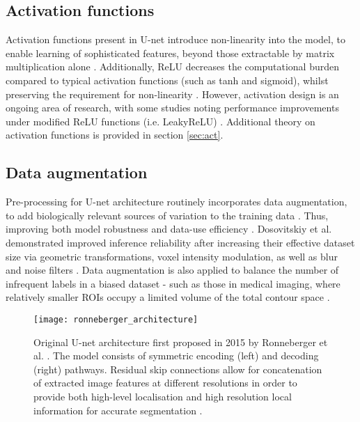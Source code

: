 \subsection{Activation functions}

Activation functions present in U-net introduce non-linearity into the model, to enable learning of sophisticated features, beyond those extractable by matrix multiplication alone \cite{Maier2019}. Additionally, ReLU decreases the computational burden compared to typical activation functions (such as tanh and sigmoid), whilst preserving the requirement for non-linearity \cite{Chigozie2018}. However, activation design is an ongoing area of research, with some studies noting performance improvements under modified ReLU functions (i.e. LeakyReLU) \cite{Lin2018}. Additional theory on activation functions is provided in section \ref{sec:act}.

\subsection{Data augmentation}

Pre-processing for U-net architecture routinely incorporates data augmentation, to add biologically relevant sources of variation to the training data \cite{Maier2019, Hesamian2019, Lundervold2019}. Thus, improving both model robustness and data-use efficiency \cite{Ronneberger_2015}. Dosovitskiy et al. demonstrated improved inference reliability after increasing their effective dataset size via geometric transformations, voxel intensity modulation, as well as blur and noise filters \cite{Dosovitskiy2014}. Data augmentation is also applied to balance the number of infrequent labels in a biased dataset \cite{Maier2019} - such as those in medical imaging, where relatively smaller ROIs occupy a limited volume of the total contour space \cite{Khan2019}. 


\begin{figure}
	\begin{center}
		\texttt{[image: ronneberger\_architecture]}
		\caption{Original U-net architecture first proposed in 2015 by Ronneberger et al. \cite{Ronneberger_2015}. The model consists of symmetric encoding (left) and decoding (right) pathways. Residual skip connections allow for concatenation of extracted image features at different resolutions in order to provide both high-level localisation and high resolution local information for accurate segmentation \cite{Nemoto_2020}.}
		\label{fig:unet}
	\end{center}
\end{figure}



